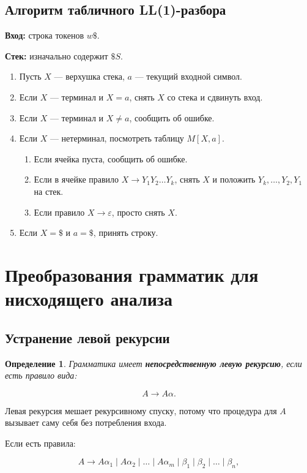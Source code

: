 \documentclass[12pt,a4paper]{article}
\newtheorem{definition}{Определение}
\begin{document}
\subsection{Алгоритм табличного LL(1)-разбора}

\textbf{Вход:} строка токенов $w\$$.

\textbf{Стек:} изначально содержит $\$S$.

\begin{enumerate}
    \item Пусть $X$ --- верхушка стека, $a$ --- текущий входной символ.
    \item Если $X$ --- терминал и $X=a$, снять $X$ со стека и сдвинуть вход.
    \item Если $X$ --- терминал и $X\ne a$, сообщить об ошибке.
    \item Если $X$ --- нетерминал, посмотреть таблицу $M[X,a]$.
    \begin{enumerate}
        \item Если ячейка пуста, сообщить об ошибке.
        \item Если в ячейке правило $X \to Y_1Y_2\ldots Y_k$, снять $X$ и положить $Y_k,\ldots,Y_2,Y_1$ на стек.
        \item Если правило $X \to \varepsilon$, просто снять $X$.
    \end{enumerate}
    \item Если $X=\$$ и $a=\$$, принять строку.
\end{enumerate}

\section{Преобразования грамматик для нисходящего анализа}

\subsection{Устранение левой рекурсии}

\begin{definition}
Грамматика имеет \textbf{непосредственную левую рекурсию}, если есть правило вида:

\[
A \to A\alpha.
\]
\end{definition}

Левая рекурсия мешает рекурсивному спуску, потому что процедура для $A$ вызывает саму себя без потребления входа.

Если есть правила:

\[
A \to A\alpha_1 \mid A\alpha_2 \mid \ldots \mid A\alpha_m
\mid
\beta_1 \mid \beta_2 \mid \ldots \mid \beta_n,
\]
\end{document}
